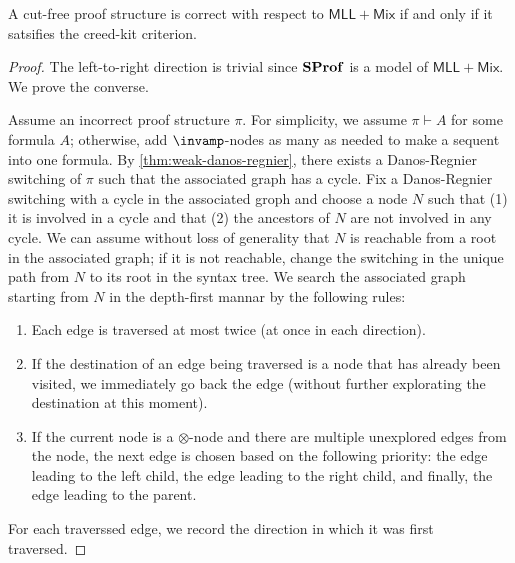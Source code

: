 \begin{theorem}\label{thm:creed-kit-correctness-without-cut}
    A cut-free proof structure is correct with respect to \( \mathsf{MLL+Mix} \) if and only if it satsifies the creed-kit criterion.
\end{theorem}
\begin{proof}
    The left-to-right direction is trivial since \( \mathbf{SProf} \) is a model of \( \mathsf{MLL+Mix} \).
    We prove the converse.

    Assume an incorrect proof structure \( \pi \).
    For simplicity, we assume \( \pi \vdash A \) for some formula \( A \); otherwise, add \( \llpar \)-nodes as many as needed to make a sequent into one formula.
    By \cref{thm:weak-danos-regnier}, there exists a Danos-Regnier switching of \( \pi \) such that the associated graph has a cycle.
    Fix a Danos-Regnier switching with a cycle in the associated groph and choose a node \( N \) such that (1) it is involved in a cycle and that (2) the ancestors of \( N \) are not involved in any cycle.
    We can assume without loss of generality that \( N \) is reachable from a root in the associated graph; if it is not reachable, change the switching in the unique path from \( N \) to its root in the syntax tree.
    We search the associated graph starting from \( N \) in the depth-first mannar by the following rules:
    \begin{enumerate}
        \item 
        Each edge is traversed at most twice (at once in each direction).
        \item
        If the destination of an edge being traversed is a node that has already been visited, we immediately go back the edge (without further explorating the destination at this moment).
        \item
        If the current node is a \( \otimes \)-node and there are multiple unexplored edges from the node, the next edge is chosen based on the following priority: the edge leading to the left child, the edge leading to the right child, and finally, the edge leading to the parent.
    \end{enumerate}
    For each traverssed edge, we record the direction in which it was first traversed.


\end{proof}
